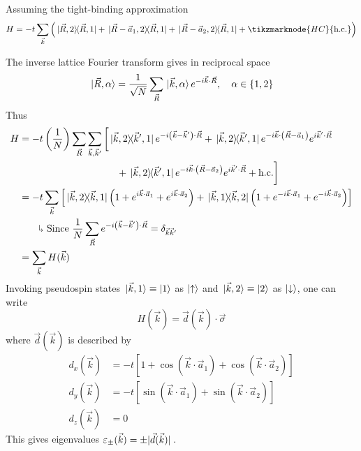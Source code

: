 \documentclass[12pt,a4paper,titlepage]{article}
\newcommand{\trm}[1]{\textrm{#1}} %
\newcommand{\up}{\uparrow} %
\newcommand{\dn}{\downarrow} %
\newcommand{\explain}{\quad\rotatebox[origin=c]{180}{$\Lsh$}} %
\begin{document}
Assuming the tight-binding approximation
\begin{equation}
H=-t\sum_{\vec{k}}\left(\ketbra*{\vec{R},2}{\vec{R},1}+\ketbra*{\vec{R}-\vec{a}_{1},2}{\vec{R},1}+\ketbra*{\vec{R}-\vec{a}_{2},2}{\vec{R},1}+\tikzmarknode{HC}{\trm{h.c.}}\right)
\end{equation}
The inverse lattice Fourier transform gives in reciprocal space
\begin{equation}
\ket*{\vec{R},\alpha}=\frac{1}{\sqrt{N}}\sum_{\vec{R}}\ket*{\vec{k},\alpha}e^{-i\vec{k}\cdot\vec{R}},\quad\alpha\in\{1,2\}
\end{equation}
Thus
\begin{equation}
\begin{aligned}
H&=-t\left(\frac{1}{N}\right)\sum_{\vec{R}}\sum_{\vec{k},\vec{k}'}\bigg[\ketbra*{\vec{k},2}{\vec{k}',1}e^{-i\left(\vec{k}-\vec{k}'\right)\cdot\vec{R}}+\ketbra*{\vec{k},2}{\vec{k}',1}e^{-i\vec{k}\cdot\left(\vec{R}-\vec{a}_{1}\right)}e^{i\vec{k}'\cdot\vec{R}}\\
&\qquad\qquad\qquad\qquad\qquad+\ketbra*{\vec{k},2}{\vec{k}',1}e^{-i\vec{k}\cdot\left(\vec{R}-\vec{a}_{2}\right)}e^{i\vec{k}'\cdot\vec{R}}+\trm{h.c.}\bigg]\\
&=-t\sum_{\vec{k}}\left[\ketbra*{\vec{k},2}{\vec{k},1}\left(1+e^{i\vec{k}\cdot\vec{a}_{1}}+e^{i\vec{k}\cdot\vec{a}_{2}}\right)+\ketbra*{\vec{k},1}{\vec{k},2}\left(1+e^{-i\vec{k}\cdot\vec{a}_{1}}+e^{-i\vec{k}\cdot\vec{a}_{2}}\right)\right]\\
&\quad\explain\trm{ Since }\frac{1}{N}\sum_{\vec{R}}e^{-i\left(\vec{k}-\vec{k}'\right)\cdot\vec{R}}=\delta_{\vec{k}\vec{k}'}\\
&=\sum_{\vec{k}}H(\vec{k})
\end{aligned}
\end{equation}
Invoking pseudospin states $\ket*{\vec{k},1}\equiv\ket{1}$ as $\ket{\up}$ and $\ket*{\vec{k},2}\equiv\ket{2}$ as $\ket{\dn}$, one can write
\begin{equation}
H(\vec{k})=\vec{d}(\vec{k})\cdot\vec{\sigma}
\end{equation}
where $\vec{d}(\vec{k})$ is described by
\begin{equation}
\begin{aligned}
d_{x}(\vec{k})&=-t\left[1+\cos(\vec{k}\cdot\vec{a}_{1})+\cos(\vec{k}\cdot\vec{a}_{2})\right]\\
d_{y}(\vec{k})&=-t\left[\sin(\vec{k}\cdot\vec{a}_{1})+\sin(\vec{k}\cdot\vec{a}_{2})\right]\\
d_{z}(\vec{k})&=0
\end{aligned}
\end{equation}
This gives eigenvalues $\varepsilon_{\pm}(\vec{k})=\pm\abs*{\vec{d}(\vec{k})}$.\\
\end{document}
